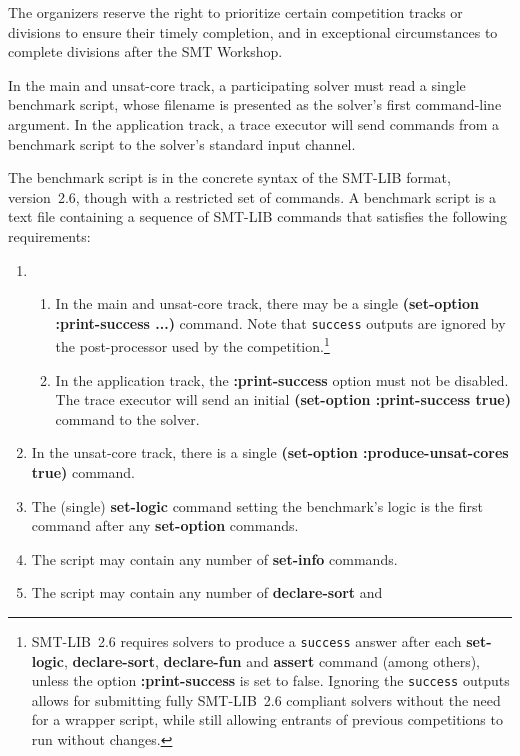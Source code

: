 \documentclass[12pt]{article}
\newcommand{\akey}[1]{\textbf{#1}}
\begin{document}
The organizers reserve the right to prioritize certain competition
tracks or divisions to ensure their timely completion, and in
exceptional circumstances to complete divisions after the SMT
Workshop.

%
In the main and unsat-core track, a participating solver must read a
single benchmark script, whose filename is presented as the solver's
first command-line argument.  In the application track, a trace
executor will send commands from a benchmark script to the solver's
standard input channel.

The benchmark script is in the concrete syntax of the SMT-LIB format,
version~2.6, though with a restricted set of commands.  A benchmark
script is a text file containing a sequence of SMT-LIB commands that
satisfies the following requirements:
%
\begin{enumerate}
\item
  \begin{enumerate}
  \item In the main and unsat-core track, there may be a single
    \akey{(set-option :print-success ...)} command.  Note that
    \texttt{success} outputs are ignored by the post-processor used by
    the competition.\footnote{SMT-LIB~2.6 requires solvers to produce
      a \texttt{success} answer after each \akey{set-logic},
      \akey{declare-sort}, \akey{declare-fun} and \akey{assert}
      command (among others), unless the option \akey{:print-success}
      is set to false.  Ignoring the \texttt{success} outputs allows
      for submitting fully SMT-LIB~2.6 compliant solvers without the
      need for a wrapper script, while still allowing entrants of
      previous competitions to run without changes.}
  \item In the application track, the \akey{:print-success} option
    must not be disabled.  The trace executor will send an initial
      \akey{(set-option :print-success true)} command to the solver.
  \end{enumerate}
\item In the unsat-core track, there is a single \akey{(set-option
  :produce-unsat-cores true)} command.
\item The (single) \akey{set-logic} command setting the benchmark's
  logic is the first command after any \akey{set-option} commands.
\item The script may contain any number of \akey{set-info} commands.
\item The script may contain any number of \akey{declare-sort} and

\end{enumerate}
\end{document}
